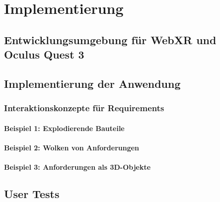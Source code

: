 \chapter{Implementierung}

\section{Entwicklungsumgebung für WebXR und Oculus Quest 3}

\section{Implementierung der Anwendung}

\subsection{Interaktionskonzepte für Requirements}

\subsubsection{Beispiel 1: Explodierende Bauteile}

\subsubsection{Beispiel 2: Wolken von Anforderungen}

\subsubsection{Beispiel 3: Anforderungen als 3D-Objekte}

\section{User Tests}